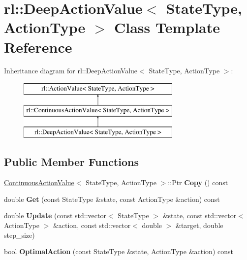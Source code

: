 \hypertarget{classrl_1_1_deep_action_value}{}\section{rl\+:\+:Deep\+Action\+Value$<$ State\+Type, Action\+Type $>$ Class Template Reference}
\label{classrl_1_1_deep_action_value}
Inheritance diagram for rl\+:\+:Deep\+Action\+Value$<$ State\+Type, Action\+Type $>$\+:\begin{figure}[H]
\begin{center}
\leavevmode
\includegraphics[height=3.000000cm]{classrl_1_1_deep_action_value}
\end{center}
\end{figure}
\subsection*{Public Member Functions}
\begin{DoxyCompactItemize}
\item 
\hypertarget{classrl_1_1_deep_action_value_a30161f628fdfdaf3dfaf14603689d222}{}\label{classrl_1_1_deep_action_value_a30161f628fdfdaf3dfaf14603689d222} 
\hyperlink{classrl_1_1_continuous_action_value}{Continuous\+Action\+Value}$<$ State\+Type, Action\+Type $>$\+::Ptr {\bfseries Copy} () const
\item 
\hypertarget{classrl_1_1_deep_action_value_a05cfe98dbeddf44118db5ed65c3506c7}{}\label{classrl_1_1_deep_action_value_a05cfe98dbeddf44118db5ed65c3506c7} 
double {\bfseries Get} (const State\+Type \&state, const Action\+Type \&action) const
\item 
\hypertarget{classrl_1_1_deep_action_value_ae0c6467c0891f2af9b1f66da7f68da46}{}\label{classrl_1_1_deep_action_value_ae0c6467c0891f2af9b1f66da7f68da46} 
double {\bfseries Update} (const std\+::vector$<$ State\+Type $>$ \&state, const std\+::vector$<$ Action\+Type $>$ \&action, const std\+::vector$<$ double $>$ \&target, double step\+\_\+size)
\item 
\hypertarget{classrl_1_1_deep_action_value_aa5c7da7a957b8d3cecb4dd5dacb38cfe}{}\label{classrl_1_1_deep_action_value_aa5c7da7a957b8d3cecb4dd5dacb38cfe} 
bool {\bfseries Optimal\+Action} (const State\+Type \&state, Action\+Type \&action) const
\end{DoxyCompactItemize}
